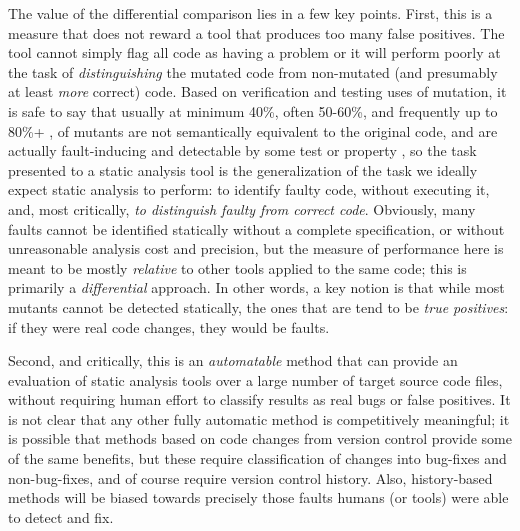 The value of the differential comparison lies in a few key points.  First, this is a measure that does not reward a tool that produces too many false positives.  The tool cannot simply flag all code as having a problem or it will perform poorly at the task of \emph{distinguishing} the mutated code from non-mutated (and presumably at least \emph{more} correct) code.  Based on verification and testing uses of mutation, it is safe to say that usually at minimum 40\%, often 50-60\%, and frequently up to 80\%+ \cite{mutKernel,groce2018verified,le2014mucheck}, of mutants are not semantically equivalent to the original code, and are actually fault-inducing and detectable by some test or property \cite{TCE,impactEquiv,smith2009should}, so the task presented to a static analysis tool is the generalization of the task we ideally expect static analysis to perform:  to identify faulty code, without executing it, and, most critically, \emph{to distinguish faulty from correct code}.  Obviously, many faults cannot be identified statically without a complete specification, or without unreasonable analysis cost and precision, but the measure of performance here is meant to be mostly \emph{relative} to other tools applied to the same code; this is primarily a \emph{differential} approach.  In other words, a key notion is that while most mutants cannot be detected statically, the ones that are tend to be \emph{true positives}: if they were real code changes, they would be faults.

Second, and critically, this is an \emph{automatable} method that can provide an evaluation of static analysis tools over a large number of target source code files, without requiring human effort to classify results as real bugs or false positives.  It is not clear that any other fully automatic method is competitively meaningful; it is possible that methods based on code changes from version control provide some of the same benefits, but these require classification of changes into bug-fixes and non-bug-fixes, and of course require version control history.  Also, history-based methods will be biased towards precisely those faults humans (or tools) were able to detect and fix.

